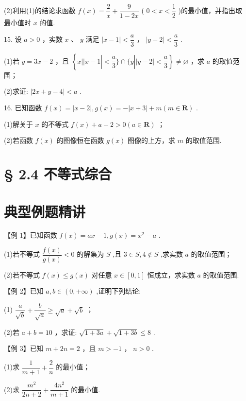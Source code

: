 (2)利用(1)的结论求函数 $f\left( x\right)  = \dfrac{2}{x} + \dfrac{9}{1 - {2x}}$ ( $0 < x < \dfrac{1}{2}$ )的最小值，并指出取最小值时 $x$ 的值.

15. 设 $a > 0$ ，实数 $x$ 、 $y$ 满足 $\left| {x - 1}\right|  < \dfrac{a}{3}$ ， $\left| {y - 2}\right|  < \dfrac{a}{3}$ .

(1)若 $y = {3x} - 2$ ，且 $\left\{  {x\left| \right| x - 1\left| { < \dfrac{a}{3}\} \cap \{ y}\right| \left| {y - 2}\right|  < \dfrac{a}{3}}\right\}   \neq  \varnothing$ ，求 $a$ 的取值范围；

(2)求证: $\left| {{{2x} + y} - 4}\right|  < a$ .

16. 已知函数 $f\left( x\right)  = \left| {x - 2}\right| ,g\left( x\right)  =  - \left| {x + 3}\right|  + m\left( {m \in  \mathbf{R}}\right)$ .

(1)解关于 $x$ 的不等式 $f\left( x\right)  + a - 2 > 0\left( {a \in  \mathbf{R}}\right)$ ；

(2)若函数 $f\left( x\right)$ 的图像恒在函数 $g\left( x\right)$ 图像的上方，求 $m$ 的取值范围.

\section*{§ 2.4 不等式综合}

\section*{典型例题精讲}

【例 1】已知函数 $f\left( x\right)  = {ax} - 1,g\left( x\right)  = {x}^{2} - a$ .

(1)若不等式 $\dfrac{f\left( x\right) }{g\left( x\right) } < 0$ 的解集为 $S$ ,且 $3 \in  S,4 \notin  S$ ,求实数 $a$ 的取值范围；

(2)若不等式 $f\left( x\right)  \leq  g\left( x\right)$ 对任意 $x \in  \left\lbrack  {0,1}\right\rbrack$ 恒成立，求实数 $a$ 的取值范围.

【例 2】已知 $a,b \in  \left( {0, + \infty }\right)$ ,证明下列结论:

(1) $\dfrac{a}{\sqrt{b}} + \dfrac{b}{\sqrt{a}} \geq  \sqrt{a} + \sqrt{b}$ ；

(2)若 $a + b = {10}$ ，求证: $\sqrt{1 + {3a}} + \sqrt{1 + {3b}} \leq  8$ .

【例 3】已知 $m + {2n} = 2$ ，且 $m >  - 1$ ， $n > 0$ .

(1)求 $\dfrac{1}{m + 1} + \dfrac{2}{n}$ 的最小值；

(2)求 $\dfrac{{m}^{2}}{{2n} + 2} + \dfrac{4{n}^{2}}{m + 1}$ 的最小值.

